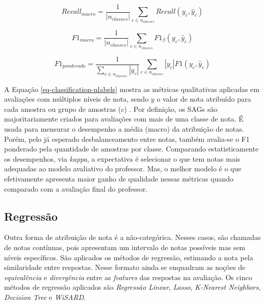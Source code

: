 \begin{equation*}
Recall_{macro} = \frac{1}{\left|n_{classes}\right|} \sum_{c \in n_{classes}} Recall(y_c, \hat{y}_c)
\end{equation*}

\begin{equation*}
F{1}_{macro} = \frac{1}{\left|n_{classes}\right|} \sum_{c \in n_{classes}} F{1}_\beta(y_c, \hat{y}_c)
\end{equation*}

\begin{equation*}
F{1}_{ponderado} = \frac{1}{\sum_{c \in n_{classes}} \left|y_c\right|} \sum_{c \in n_{classes}} \left|y_c\right| F{1}(y_c, \hat{y}_c)
\end{equation*}

A Equação \ref{eq-classification-nlabels} mostra as métricas qualitativas aplicadas em avaliações com múltiplos níveis de nota, sendo $y$ o valor de nota atribuído para cada amostra ou grupo de amostras ($c$) \cite{manning2008}. Por definição, os SAGs são majoritariamente criados para avaliações com mais de uma classe de nota. É usada para mensurar o desempenho a média (macro) da atribuição de notas. Porém, pelo já esperado desbalanceamento entre notas, também avalia-se o F1 ponderado pela quantidade de amostras por classe. Comparando estatisticamente os desempenhos, via \textit{kappa}, a expectativa é selecionar o que tem notas mais adequadas ao modelo avaliativo do professor. Mas, o melhor modelo é o que efetivamente apresenta maior ganho de qualidade nessas métricas quando comparado com a avaliação final do professor.


\subsection{Regressão}
\label{subsec-regressao}

Outra forma de atribuição de nota é a não-categórica. Nesses casos, são chamadas de notas contínuas, pois apresentam um intervalo de notas possíveis mas sem níveis específicos. São aplicados os métodos de regressão, estimando a nota pela similaridade entre respostas. Nesse formato ainda se enquadram as noções de \textit{equivalência} e \textit{divergência} entre as \textit{features} das respostas na avaliação. Os cinco métodos de regressão aplicados são \textit{Regressão Linear}, \textit{Lasso}, \textit{K-Nearest Neighbors}, \textit{Decision Tree} e \textit{WiSARD}.

